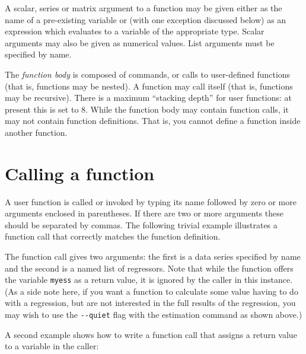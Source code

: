 A scalar, series or matrix argument to a function may be given either
as the name of a pre-existing variable or (with one exception
discussed below) as an expression which evaluates to a variable of the
appropriate type.  Scalar arguments may also be given as numerical
values.  List arguments must be specified by name.
    
The \textsl{function body} is composed of  commands, or
calls to user-defined functions (that is, functions may be nested).  A
function may call itself (that is, functions may be recursive). There
is a maximum ``stacking depth'' for user functions: at present this is
set to 8.  While the function body may contain function calls, it may
not contain function definitions.  That is, you cannot define a
function inside another function.  


\section{Calling a function}
\label{func-call}

A user function is called or invoked by typing its name followed by
zero or more arguments enclosed in parentheses.  If there are two or
more arguments these should be separated by commas.  The following
trivial example illustrates a function call that correctly matches the
function definition.
    

The function call gives two arguments: the first is a data series
specified by name and the second is a named list of regressors.  Note
that while the function offers the variable \verb+myess+ as a return
value, it is ignored by the caller in this instance.  (As a side note
here, if you want a function to calculate some value having to do with
a regression, but are not interested in the full results of the
regression, you may wish to use the \verb+--quiet+ flag with the
estimation command as shown above.)
    
A second example shows how to write a function call that assigns
a return value to a variable in the caller:
    
